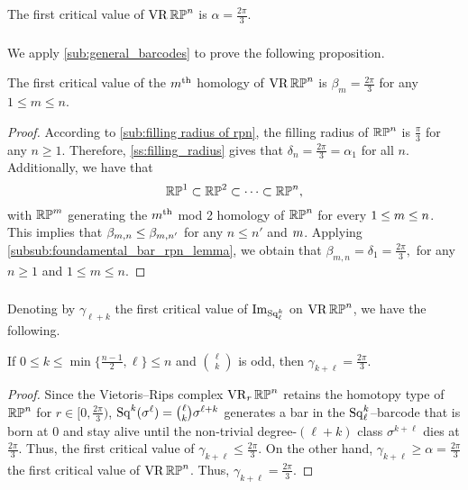 \medskip\proposition
The first critical value of \(\operatorname{VR}\mathbb{RP}^n\) is \(\alpha = \frac{2\pi}{3}\).

\subsubsection{}
\label{subsub:beta_m_rpn}

We apply \cref{sub:general_barcodes} to prove the following proposition.

\medskip\proposition
The first critical value of the $m^{\mathrm{th}}$ homology of $\operatorname{VR}\mathbb{RP}^n$ is $\beta_m=\frac{2\pi}{3}$ for any $1\leq m\leq n$.

\begin{proof}%
	According to \cref{sub:filling radius of rpn}, the filling radius of $\mathbb{RP}^n$ is $\frac{\pi}{3}$ for any $n \geq 1$.
	Therefore, \cref{ss:filling_radius} gives that $\delta_n = \tfrac{2\pi}{3} = \alpha_1$ for all $n$.
	Additionally, we have that
	\[
	\mathbb{RP}^1 \subset \mathbb{RP}^2 \subset \dots \subset \mathbb{RP}^n,
	\]
	with $\mathbb{RP}^m$ generating the $m^{\mathrm{th}}$ mod 2 homology of $\mathbb{RP}^n$ for every $1 \leq m \leq n$.
	This implies that $\beta_{m, n} \leq \beta_{m, n'}$ for any $n\leq n'$ and $m$.
	Applying \cref{subsub:foundamental_bar_rpn_lemma}, we obtain that $\beta_{m,n} = \delta_1 = \tfrac{2\pi}{3},$ for any $n\geq 1$ and $1 \leq m \leq n$.
\end{proof}

\subsubsection{}
\label{subsub:gamma_rpn}

Denoting by \(\gamma_{\ell+k}\) the first critical value of \(\operatorname{Im}_{\operatorname{Sq}^k_\ell}\) on \(\operatorname{VR}\mathbb{RP}^n\), we have the following.

\medskip\proposition
If $0 \leq k \leq \min\{\frac{n-1}{2}, \ell\} \leq n$ and $\binom{\ell}{k}$ is odd, then $\gamma_{k+\ell} = \tfrac{2\pi}{3}$.

\begin{proof}
	Since the Vietoris--Rips complex $\operatorname{VR}_r\mathbb{RP}^n$ retains the homotopy type of $\mathbb{RP}^n$ for $r \in [0,\tfrac{2\pi}{3})$, $\operatorname{Sq}^k(\sigma^\ell) = \binom{\ell}{k}\sigma^{\ell+k}$ generates a bar in the $\operatorname{Sq}^k_\ell$--barcode that is born at $0$ and stay alive until the non-trivial degree-$(\ell+k)$ class $\sigma^{k+\ell}$ dies at $\tfrac{2\pi}{3}$.
	Thus, the first critical value of $\gamma_{k+\ell} \leq \tfrac{2\pi}{3}$.
	On the other hand, $\gamma_{k+\ell} \geq \alpha = \tfrac{2\pi}{3}$ the first critical value of $\operatorname{VR}\mathbb{RP}^n$.
	Thus, $\gamma_{k+\ell} = \tfrac{2\pi}{3}$.
\end{proof}
